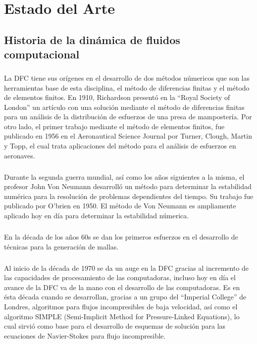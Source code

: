 \documentclass[letterpaper, openright, 12pt]{book}
\begin{document}
	\chapter{Estado del Arte}
		\section{Historia de la dinámica de fluidos computacional}
				\paragraph*{}
					La DFC tiene sus orígenes en el desarrollo de dos métodos númericos que son las herramientas base de esta disciplina, el método de diferencias finitas y el método de elementos finitos. En 1910, Richardson presentó en la ``Royal Society of London'' un artículo con una solución mediante el método de diferencias finitas para un análisis de la distribución de esfuerzos de una presa de mampostería. Por otro lado, el primer trabajo mediante el método de elementos finitos, fue publicado en 1956 en el Aeronautical Science Journal por Turner, Clough, Martin y Topp, el cual trata aplicaciones del método para el análisis de esfuerzos en aeronaves.\cite{tj-chung}
				
				\paragraph*{}
					Durante la segunda guerra mundial, así como los años siguientes a la misma, el profesor John Von Neumann desarrolló un método para determinar la estabilidad numérica para la resolución de problemas dependientes del tiempo. Su trabajo fue publicado por O'brien en 1950. El método de Von Neumann es ampliamente aplicado hoy en día para determinar la estabilidad númerica.\cite{pletcher-CFD-HeatTransfer}
				
				\paragraph*{}
					En la década de los años 60s se dan los primeros esfuerzos en el desarrollo de técnicas para la generación de mallas. \cite{liseikin1999grid}
					
				\paragraph*{}
					Al inicio de la década de 1970 se da un auge en la DFC gracias al incremento de las capacidades de procesamiento de las computadoras, incluso hoy en día el avance de la DFC va de la mano con el desarrollo de las computadoras.\cite{blazek} Es en ésta década cuando se desarrollan, gracias a un grupo del ``Imperial College'' de Londres, algoritmos para flujos incompresibles de baja velocidad, así como el algoritmo SIMPLE (Semi-Implicit Method for Pressure-Linked Equations), lo cual sirvió como base para el desarrollo de esquemas de solución para las ecuaciones de Navier-Stokes para flujo incompresible.\cite{pletcher-CFD-HeatTransfer}
					
\end{document}
